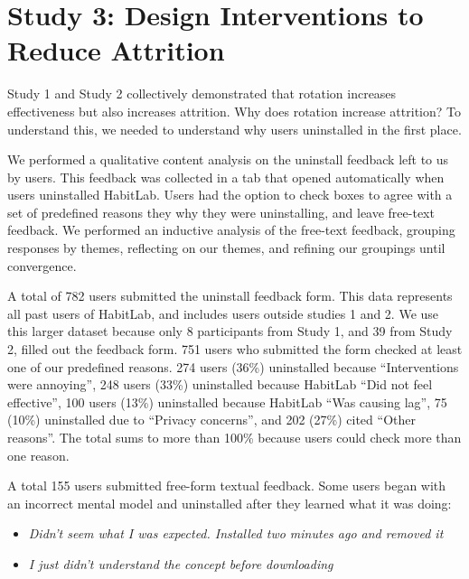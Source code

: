 \section{Study 3: Design Interventions to Reduce Attrition}

Study 1 and Study 2 collectively demonstrated that rotation increases effectiveness but also increases attrition. Why does rotation increase attrition? To understand this, we needed to understand why users uninstalled in the first place.

We performed a qualitative content analysis on the uninstall feedback left to us by users. This feedback was collected in a tab that opened automatically when users uninstalled HabitLab.  Users had the option to check boxes to agree with a set of predefined reasons they why they were uninstalling, and leave free-text feedback. We performed an inductive analysis of the free-text feedback, grouping responses by themes, reflecting on our themes, and refining our groupings until convergence.


A total of 782 users submitted the uninstall feedback form. This data represents all past users of HabitLab, and includes users outside studies 1 and 2. We use this larger dataset because only 8 participants from Study 1, and 39 from Study 2, filled out the feedback form. 751 users who submitted the form checked at least one of our predefined reasons. 274 users (36\%) uninstalled because ``Interventions were annoying'', 248 users (33\%) uninstalled because HabitLab ``Did not feel effective'', 100 users (13\%) uninstalled because HabitLab ``Was causing lag'', 75 (10\%) uninstalled due to ``Privacy concerns'', and 202 (27\%) cited ``Other reasons''. The total sums to more than 100\% because users could check more than one reason.

A total 155 users submitted free-form textual feedback. Some users began with an incorrect mental model and uninstalled after they learned what it was doing:
\begin{itemize}
\item \textit{Didn't seem what I was expected. Installed two minutes ago and removed it}
\item \textit{I just didn't understand the concept before downloading} %
\end{itemize}

